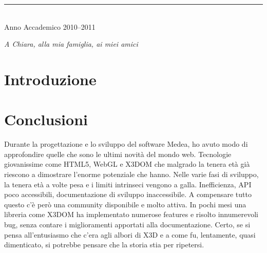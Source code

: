\documentclass[a4paper,12pt]{report}
\def\annoaccademico{2010--2011}
\def\dedica{A Chiara, alla mia famiglia, ai miei amici}
\newlength\corpo
\begin{document}
\begin{titlepage}
\vfill

\vspace{0.8cm}

\begin{center}

\rule{40mm}{0.01mm}\\

Anno Accademico \annoaccademico

\end{center}

\end{titlepage}
\newpage
\vspace*{2.5cm}
\begin{flushright}
\begin{Large}\emph{\dedica}\end{Large}
\end{flushright}
\frenchspacing
%

\tableofcontents
\listoffigures
{}
\chapter*{Introduzione}
\pagestyle{fancy}
\fancyfoot[RO]{\thepage \hfil}



\chapter*{Conclusioni}
Durante la progettazione e lo sviluppo del software Medea, ho avuto modo di approfondire quelle che sono le ultimi novità del mondo web. Tecnologie giovanissime come HTML5, WebGL e X3DOM che malgrado la tenera età già riescono a dimostrare l'enorme potenziale che hanno. Nelle varie fasi di sviluppo, la tenera età a volte pesa e i limiti intrinseci vengono a galla. Inefficienza, API poco accessibili, documentazione di sviluppo inaccessibile. A compensare tutto questo c'è però una community disponibile e molto attiva. In pochi mesi una libreria come X3DOM ha implementato numerose features e risolto innumerevoli bug, senza contare i miglioramenti apportati alla documentazione. Certo, se si pensa all'entusiasmo che c'era agli albori di X3D e a come fu, lentamente, quasi dimenticato, si potrebbe pensare che la storia stia per ripetersi.
\end{document}
